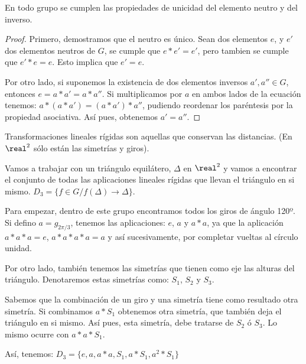 \documentclass{apuntes}
\begin{document}
  
  \begin{theorem}
   En todo grupo se cumplen las propiedades de unicidad del elemento neutro y del inverso.
  \end{theorem}
  
  \begin{proof}
 Primero, demostramos que el neutro es único. Sean dos elementos $e$, y $e'$ dos elementos neutros de $G$, se cumple que $e\ast e'=e'$, pero tambien se cumple que $e'\ast e=e$. Esto implica que $e'=e$.

 Por otro lado, si suponemos la existencia de dos elementos inversos $a',a''\in G$, entonces $e=a\ast a'=a\ast a''$. Si multiplicamos por $a$ en ambos lados de la ecuación tenemos: $a\ast (a\ast a')=(a\ast a')\ast a''$, pudiendo reordenar los paréntesis por la 
 propiedad asociativa. Así pues, obtenemos $a'=a''$.
  \end{proof}
  
 \begin{defn}
  Transformaciones lineales rígidas son aquellas que conservan las distancias. (En $\real^{2}$  sólo están las simetrías y giros).
 \end{defn}
 
 \begin{example} 
  Vamos a trabajar con un triángulo equilátero, $\Delta$  en $\real^{2}$  y vamos a encontrar el conjunto de todas las aplicaciones lineales rígidas 
  que llevan el triángulo en si mismo. $D_{3}=\{f\in G / f(\Delta)\longrightarrow\Delta\}$.
  
  Para empezar, dentro de este grupo encontramos todos los giros de ángulo 120º. Si defino $a=g_{2\pi/3}$, tenemos las aplicaciones:
  $e$, $a$  y $a\ast a$, ya que la aplicación $a\ast a\ast a=e$, $a\ast a\ast a\ast a=a$  y así sucesivamente, por completar vueltas al círculo unidad.
  
  Por otro lado, también tenemos las simetrías que tienen como eje las alturas del triángulo. Denotaremos estas simetrías como: $S_{1}$, $S_{2}$  y $S_{3}$.
  
  Sabemos que la combinación de un giro y una simetría tiene como resultado otra simetría. Si combinamos $a\ast S_{1}$  obtenemos otra simetría, que también deja el triángulo en si mismo. Así pues, esta simetría, debe tratarse de $S_{2}$  ó $S_{3}$. Lo mismo ocurre con $a\ast a\ast S_{1}$.
  
  Así, tenemos: $D_{3}=\{e, a, a\ast a, S_{1}, a\ast S_{1}, a^{2}\ast S_{1}\}$
 \end{example}
\end{document}
